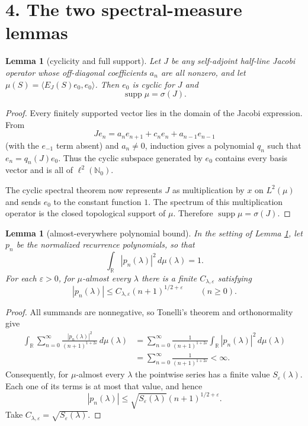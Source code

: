 \documentclass[11pt]{article}
\newtheorem{lemma}[theorem]{Lemma}
\newcommand{\R}{\mathbb R}
\newcommand{\N}{\mathbb N_0}
\newcommand{\elltwo}{\ell^2(\N)}
\newcommand{\supp}{\operatorname{supp}}
\begin{document}
\clearpage
\section*{4. The two spectral-measure lemmas}

\begin{lemma}[cyclicity and full support]\label{lem:cyclic}
Let $J$ be any self-adjoint half-line Jacobi operator whose off-diagonal coefficients $a_n$ are all nonzero, and let $\mu(S)=\langle E_J(S)e_0,e_0\rangle$.  Then $e_0$ is cyclic for $J$ and
\[
 \supp\mu=\sigma(J).
\]
\end{lemma}

\begin{proof}
Every finitely supported vector lies in the domain of the Jacobi expression.  From
\[
 Je_n=a_ne_{n+1}+c_ne_n+a_{n-1}e_{n-1}
\]
(with the $e_{-1}$ term absent) and $a_n\ne0$, induction gives a polynomial $q_n$ such that $e_n=q_n(J)e_0$.  Thus the cyclic subspace generated by $e_0$ contains every basis vector and is all of $\elltwo$.

The cyclic spectral theorem now represents $J$ as multiplication by $x$ on $L^2(\mu)$ and sends $e_0$ to the constant function $1$.  The spectrum of this multiplication operator is the closed topological support of $\mu$.  Therefore $\supp\mu=\sigma(J)$.
\end{proof}

\begin{lemma}[almost-everywhere polynomial bound]\label{lem:tonelli}
In the setting of Lemma \ref{lem:cyclic}, let $p_n$ be the normalized recurrence polynomials, so that
\[
 \int_{\R}|p_n(\lambda)|^2\,d\mu(\lambda)=1.
\]
For each $\varepsilon>0$, for $\mu$-almost every $\lambda$ there is a finite $C_{\lambda,\varepsilon}$ satisfying
\[
 |p_n(\lambda)|\le C_{\lambda,\varepsilon}(n+1)^{1/2+\varepsilon}
 \qquad(n\ge0).
\]
\end{lemma}

\begin{proof}
All summands are nonnegative, so Tonelli's theorem and orthonormality give
\begin{align*}
 \int_{\R}\sum_{n=0}^{\infty}
 \frac{|p_n(\lambda)|^2}{(n+1)^{1+2\varepsilon}}\,d\mu(\lambda)
 &=\sum_{n=0}^{\infty}\frac{1}{(n+1)^{1+2\varepsilon}}
 \int_{\R}|p_n(\lambda)|^2\,d\mu(\lambda)\\
 &=\sum_{n=0}^{\infty}\frac{1}{(n+1)^{1+2\varepsilon}}<\infty.
\end{align*}
Consequently, for $\mu$-almost every $\lambda$ the pointwise series has a finite value $S_\varepsilon(\lambda)$.  Each one of its terms is at most that value, and hence
\[
 |p_n(\lambda)|
 \le \sqrt{S_\varepsilon(\lambda)}(n+1)^{1/2+\varepsilon}.
\]
Take $C_{\lambda,\varepsilon}=\sqrt{S_\varepsilon(\lambda)}$.
\end{proof}
\end{document}
